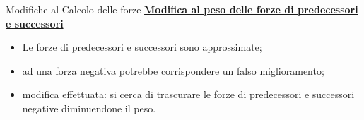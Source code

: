 \begin{slide}{Modifiche al Calcolo delle forze}
\textbf{\underline{Modifica al peso delle forze di predecessori e successori} }\\
\begin{itemize}
\item Le forze di predecessori e successori sono approssimate;
\item ad una forza negativa potrebbe corrispondere un falso miglioramento;
\item \red modifica effettuata: \black si cerca di trascurare le forze di predecessori e successori negative diminuendone il peso.
\end{itemize}
\end{slide}
